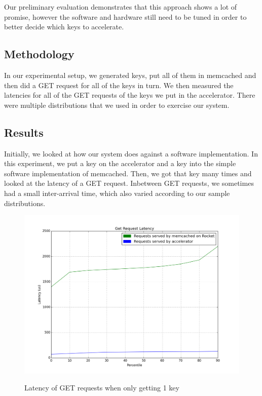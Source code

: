 Our preliminary evaluation demonstrates that this approach shows a lot of
promise, however the software and hardware still need to be tuned in order to
better decide which keys to accelerate.

\subsection{Methodology}

In our experimental setup, we generated keys, put all of them in memcached and
then did a GET request for all of the keys in turn. We then measured the
latencies for all of the GET requests of the keys we put in the accelerator.
There were multiple distributions that we used in order to exercise our system.


\subsection{Results}

Initially, we looked at how our system does against a software implementation.
In this experiment, we put a key on the accelerator and a key into the simple
software implementation of memcached. Then, we got that key many times and
looked at the latency of a GET request. Inbetween GET requests, we sometimes
had a small inter-arrival time, which also varied according to our sample
distributions.


\begin{figure}[t]
\begin{center}
\label{fig:one-req}
\includegraphics[width=\linewidth]{graph.png}
\caption{Latency of GET requests when only getting 1 key}
\end{center}
\end{figure}

